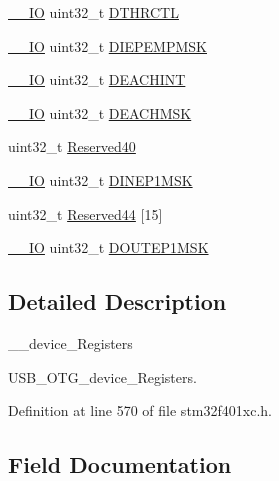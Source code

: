 \begin{DoxyCompactItemize}
\item 
\hyperlink{core__sc300_8h_aec43007d9998a0a0e01faede4133d6be}{\+\_\+\+\_\+\+IO} uint32\+\_\+t \hyperlink{struct_u_s_b___o_t_g___device_type_def_ac5d3a4bffd921da5d69f9a601263b573}{D\+T\+H\+R\+C\+TL}
\item 
\hyperlink{core__sc300_8h_aec43007d9998a0a0e01faede4133d6be}{\+\_\+\+\_\+\+IO} uint32\+\_\+t \hyperlink{struct_u_s_b___o_t_g___device_type_def_a99c6c50a3e3235c81b98a428ebd33d4c}{D\+I\+E\+P\+E\+M\+P\+M\+SK}
\item 
\hyperlink{core__sc300_8h_aec43007d9998a0a0e01faede4133d6be}{\+\_\+\+\_\+\+IO} uint32\+\_\+t \hyperlink{struct_u_s_b___o_t_g___device_type_def_ae85e8a65a72f52a9daf3d2b66b77c2e2}{D\+E\+A\+C\+H\+I\+NT}
\item 
\hyperlink{core__sc300_8h_aec43007d9998a0a0e01faede4133d6be}{\+\_\+\+\_\+\+IO} uint32\+\_\+t \hyperlink{struct_u_s_b___o_t_g___device_type_def_a0234d794aba7ddae31f3da3c02c8a673}{D\+E\+A\+C\+H\+M\+SK}
\item 
uint32\+\_\+t \hyperlink{struct_u_s_b___o_t_g___device_type_def_a9e0c029846e94bf08ac8edb35b30ecb2}{Reserved40}
\item 
\hyperlink{core__sc300_8h_aec43007d9998a0a0e01faede4133d6be}{\+\_\+\+\_\+\+IO} uint32\+\_\+t \hyperlink{struct_u_s_b___o_t_g___device_type_def_ab62b876c61e11199cf5c37aa944a5fed}{D\+I\+N\+E\+P1\+M\+SK}
\item 
uint32\+\_\+t \hyperlink{struct_u_s_b___o_t_g___device_type_def_a7a7dbcc0da59081fc6c8af59ab613520}{Reserved44} \mbox{[}15\mbox{]}
\item 
\hyperlink{core__sc300_8h_aec43007d9998a0a0e01faede4133d6be}{\+\_\+\+\_\+\+IO} uint32\+\_\+t \hyperlink{struct_u_s_b___o_t_g___device_type_def_a196e86fc15ba228188d47468349de69b}{D\+O\+U\+T\+E\+P1\+M\+SK}
\end{DoxyCompactItemize}


\subsection{Detailed Description}
\+\_\+\+\_\+device\+\_\+\+Registers 

U\+S\+B\+\_\+\+O\+T\+G\+\_\+device\+\_\+\+Registers. 

Definition at line 570 of file stm32f401xc.\+h.



\subsection{Field Documentation}
